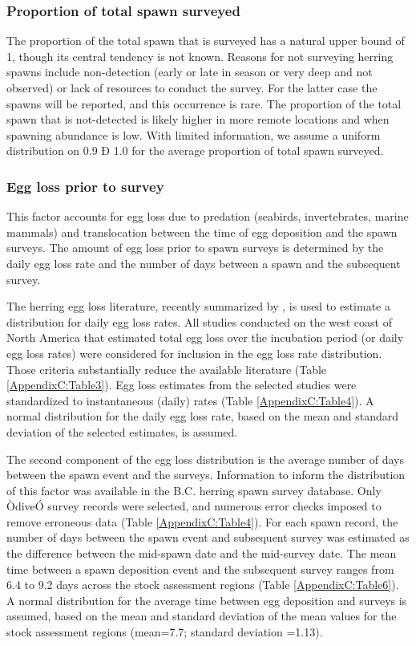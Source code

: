 \subsubsection{Proportion of total spawn surveyed}
The proportion of the total spawn that is surveyed has a natural upper bound of 1, though its central tendency is not known. Reasons for not surveying herring spawns include non-detection (early or late in season or very deep and not observed) or lack of resources to conduct the survey.  For the latter case the spawns will be reported, and this occurrence is rare. The proportion of the total spawn that is not-detected is likely higher in more remote locations and when spawning abundance is low. With limited information, we assume a uniform distribution on 0.9 Ð 1.0 for the average proportion of total spawn surveyed. 

\subsubsection{Egg loss prior to survey}

This factor accounts for egg loss due to predation (seabirds, invertebrates, marine mammals) and translocation between the time of egg deposition and the spawn surveys.  The amount of egg loss prior to spawn surveys is determined by the daily egg loss rate and the number of days between a spawn and the subsequent survey. 

The herring egg loss literature, recently summarized by \cite[][their Appendix 7]{HayEggLoss}, is used to estimate a distribution for daily egg loss rates. All studies conducted on the west coast of North America that estimated total egg loss over the incubation period (or daily egg loss rates) were considered for inclusion in the egg loss rate distribution. Those criteria substantially reduce the available literature (Table \ref{AppendixC:Table3}). Egg loss estimates from the selected studies were standardized to instantaneous (daily) rates (Table \ref{AppendixC:Table4}). A normal distribution for the daily egg loss rate, based on the mean and standard deviation of the selected estimates, is assumed. 



The second component of the egg loss distribution is the average number of days between the spawn event and the surveys.  Information to inform the distribution of this factor was available in the B.C. herring spawn survey database.  Only ÒdiveÓ survey records were selected, and numerous error checks imposed to remove erroneous data (Table \ref{AppendixC:Table4}).  For each spawn record, the number of days between the spawn event and subsequent survey was estimated as the difference between the mid-spawn date and the mid-survey date. The mean time between a spawn deposition event and the subsequent survey ranges from 6.4 to 9.2 days across the stock assessment regions (Table \ref{AppendixC:Table6}).  A normal distribution for the average time between egg deposition and surveys is assumed, based on the mean and standard deviation of the mean values for the stock assessment regions (mean=7.7; standard deviation =1.13). 


